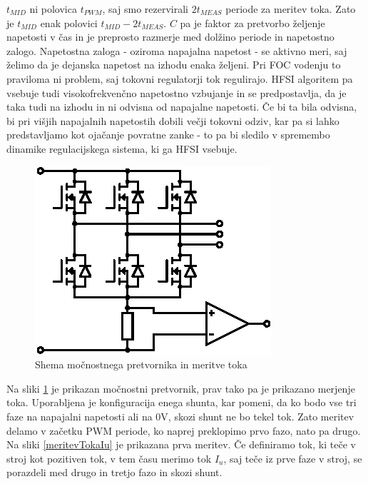 \documentclass[a4paper,twoside,openright,12pt,slovene]{book}
\begin{document}
$t_{MID}$ ni polovica $t_{PWM}$, saj smo rezervirali $2t_{MEAS}$ periode za meritev toka. Zato je $t_{MID}$ enak polovici $t_{MID} - 2t_{MEAS}$. $C$ pa je faktor za pretvorbo željenje napetosti v
čas in je preprosto razmerje med dolžino periode in napetostno zalogo. Napetostna zaloga - oziroma napajalna napetost - se aktivno meri, saj želimo da je dejanska napetost na izhodu enaka željeni. Pri
FOC vodenju to praviloma ni problem, saj tokovni regulatorji tok regulirajo. HFSI algoritem pa vsebuje tudi visokofrekvenčno napetostno vzbujanje in se predpostavlja, da je taka tudi na izhodu in ni
odvisna od napajalne napetosti. Če bi ta bila odvisna, bi pri višjih napajalnih napetostih dobili večji tokovni odziv, kar pa si lahko predstavljamo kot ojačanje povratne zanke - to pa bi sledilo v
spremembo dinamike regulacijskega sistema, ki ga HFSI vsebuje.

\begin{figure}[!htbp]
    \centering
    \includegraphics[width=0.75\columnwidth]{Slike/Inkscape/inverter.eps}
    \caption{\label{inverter} Shema močnostnega pretvornika in meritve toka }
\end{figure}

Na sliki \ref{inverter} je prikazan močnostni pretvornik, prav tako pa je prikazano merjenje toka. Uporabljena je konfiguracija enega shunta, kar pomeni, da ko bodo vse tri faze na napajalni
napetosti ali na 0V, skozi shunt ne bo tekel tok. Zato meritev delamo v začetku PWM periode, ko naprej preklopimo prvo fazo, nato pa drugo. Na sliki \ref{meritevTokaIu} je prikazana prva meritev.
Če definiramo tok, ki teče v stroj kot pozitiven tok, v tem času merimo tok $I_u$, saj teče iz prve faze v stroj, se porazdeli med drugo in tretjo fazo in skozi shunt. 
\end{document}
